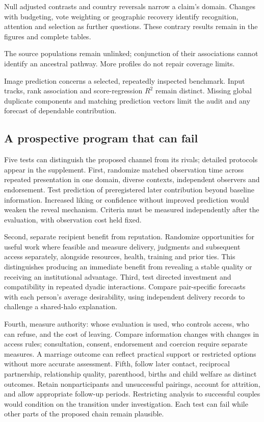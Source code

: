 Null adjusted contrasts and country reversals narrow a claim's domain. Changes with budgeting, vote weighting or geographic recovery identify recognition, attention and selection as further questions. These contrary results remain in the figures and complete tables.

The source populations remain unlinked; conjunction of their associations cannot identify an ancestral pathway. More profiles do not repair coverage limits.

Image prediction concerns a selected, repeatedly inspected benchmark. Input tracks, rank association and score-regression $R^2$ remain distinct. Missing global duplicate components and matching prediction vectors limit the audit and any forecast of dependable contribution.

\subsection{A prospective program that can fail}

Five tests can distinguish the proposed channel from its rivals; detailed protocols appear in the supplement. First, randomize matched observation time across repeated presentation in one domain, diverse contexts, independent observers and endorsement. Test prediction of preregistered later contribution beyond baseline information. Increased liking or confidence without improved prediction would weaken the reveal mechanism. Criteria must be measured independently after the evaluation, with observation cost held fixed.

Second, separate recipient benefit from reputation. Randomize opportunities for useful work where feasible and measure delivery, judgments and subsequent access separately, alongside resources, health, training and prior ties. This distinguishes producing an immediate benefit from revealing a stable quality or receiving an institutional advantage. Third, test directed investment and compatibility in repeated dyadic interactions. Compare pair-specific forecasts with each person's average desirability, using independent delivery records to challenge a shared-halo explanation.

Fourth, measure authority: whose evaluation is used, who controls access, who can refuse, and the cost of leaving. Compare information changes with changes in access rules; consultation, consent, endorsement and coercion require separate measures. A marriage outcome can reflect practical support or restricted options without more accurate assessment. Fifth, follow later contact, reciprocal partnership, relationship quality, parenthood, births and child welfare as distinct outcomes. Retain nonparticipants and unsuccessful pairings, account for attrition, and allow appropriate follow-up periods. Restricting analysis to successful couples would condition on the transition under investigation. Each test can fail while other parts of the proposed chain remain plausible.

